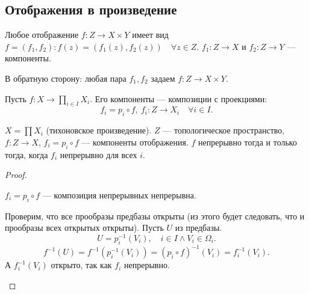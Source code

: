 \documentclass[11pt]{book}
\theoremstyle{definition}
\theoremstyle{plain}
\theoremstyle{plain}
\theoremstyle{definition}
\theoremstyle{remark}
\begin{document}
\subsection{Отображения в произведение}
\begin{defn}
    Любое отображение $ f: Z \to X \times Y$ имеет вид $ f = (f_1, f_2): f(z) = (f_1(z), f_2(z)) \quad \forall  z \in Z $.
    $ f_1: Z \to  X$ и $ f_2: Z \to  Y$ --- компоненты.

    В обратную сторону: любая пара $ f_1, f_2$ задаем $ f: Z \to  X \times Y$.
\end{defn}
\begin{defn}
    Пусть $ f: X \to \prod_{i \in I}X_i$. Его компоненты --- композиции с проекциями:
    \[
    f_i = p_i \circ f, ~ f_i : Z \to  X_i \quad \forall  i \in I
    .\] 
\end{defn}
\begin{thm}\label{th_coord}
    $ X = \prod X_i$ (тихоновское произведение). $ Z$ --- топологическое пространство, $ f: Z \to  X$, $ f_i = p_i \circ f$ --- компоненты отображения.
    $ f$ непрерывно тогда и только тогда, когда  $ f_i$ непрерывно для всех $ i$.
\end{thm}
\begin{proof}
    $ $
    \begin{description}
        \item {} $ f_i = p_i \circ f$ --- композиция непрерывных непрерывна.
	\item {} 
		Проверим, что все прообразы предбазы открыты (из этого будет следовать, что и прообразы всех открытых открыты).
		Пусть $ U$ из предбазы.
		\[
		    U = p_i^{-1}(V_i), \quad i \in I \wedge V_i \in \Omega_i
		.\] 
		\[
		    f^{-1}(U) = f^{-1} (p_i^{-1}(V_{i})) = (p_i \circ f)^{-1}(V_i) =  f_i^{-1}(V_i)
		.\] 
		А $ f_i^{-1}(V_i)$ открыто, так как $ f_i$ непрерывно.
    \end{description} 
\end{proof}
\end{document}
